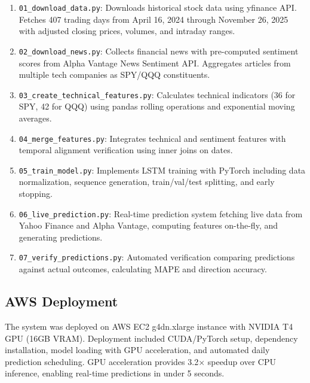 \documentclass[12pt,letterpaper]{article}
\begin{document}
\begin{enumerate}[noitemsep]
    \item \texttt{01\_download\_data.py}: Downloads historical stock data using yfinance API. Fetches 407 trading days from April 16, 2024 through November 26, 2025 with adjusted closing prices, volumes, and intraday ranges.
    
    \item \texttt{02\_download\_news.py}: Collects financial news with pre-computed sentiment scores from Alpha Vantage News Sentiment API. Aggregates articles from multiple tech companies as SPY/QQQ constituents.
    
    \item \texttt{03\_create\_technical\_features.py}: Calculates technical indicators (36 for SPY, 42 for QQQ) using pandas rolling operations and exponential moving averages.
    
    \item \texttt{04\_merge\_features.py}: Integrates technical and sentiment features with temporal alignment verification using inner joins on dates.
    
    \item \texttt{05\_train\_model.py}: Implements LSTM training with PyTorch including data normalization, sequence generation, train/val/test splitting, and early stopping.
    
    \item \texttt{06\_live\_prediction.py}: Real-time prediction system fetching live data from Yahoo Finance and Alpha Vantage, computing features on-the-fly, and generating predictions.
    
    \item \texttt{07\_verify\_predictions.py}: Automated verification comparing predictions against actual outcomes, calculating MAPE and direction accuracy.
\end{enumerate}

\subsection{AWS Deployment}

The system was deployed on AWS EC2 g4dn.xlarge instance with NVIDIA T4 GPU (16GB VRAM). Deployment included CUDA/PyTorch setup, dependency installation, model loading with GPU acceleration, and automated daily prediction scheduling. GPU acceleration provides 3.2$\times$ speedup over CPU inference, enabling real-time predictions in under 5 seconds.
\end{document}
